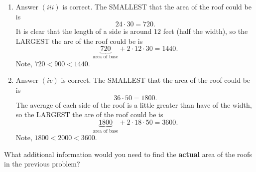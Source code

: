 \documentclass[handout,nooutcomes,noauthor,hints]{ximera}
\begin{document}
\begin{question}
\begin{enumerate}
  \end{enumerate}
  \begin{freeResponse}
    \begin{enumerate}
    \item Answer $(iii)$ is correct. The SMALLEST that the area of the
      roof could be is
      \[
      24\cdot 30 = 720.
      \]
      It is clear that the length of a side is around $12$ feet (half the width), so
      the LARGEST the are of the roof could be is
      \[
      \underbrace{720}_{\text{area of base}} + 2\cdot 12\cdot 30 = 1440.
      \]
      Note, $720 < 900 < 1440$.
    \item Answer $(iv)$ is correct.  The SMALLEST that the area of the
      roof could be is
      \[
      36\cdot 50 = 1800.
      \]
      The average of each side of the roof is a little greater than
      have of the width, so the LARGEST the are of the roof could be
      is
      \[
      \underbrace{1800}_{\text{area of base}} + 2\cdot 18\cdot 50 = 3600.
      \]
      Note, $1800 < 2000 < 3600$.
    \end{enumerate}
  \end{freeResponse}
\end{question}
\mynewpage

\begin{question}
 What additional information would you need to find the \textbf{actual} area of the roofs in the previous problem?
\end{question}
\mynewpage
\end{document}
